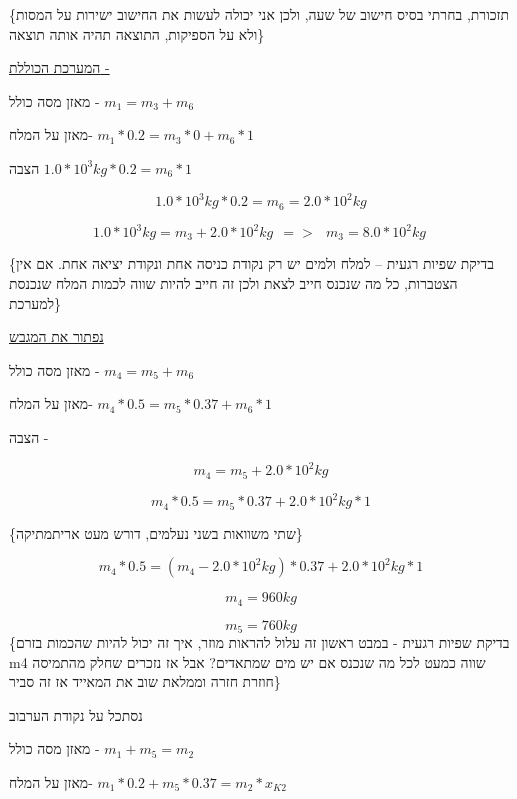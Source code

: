 \documentclass[
  hebrew,
  letterpaper,
  DIV=11,
  numbers=noendperiod]{scrreprt}
\begin{document}
\begin{tcolorbox}[enhanced jigsaw, colback=white, arc=.35mm, coltitle=black, breakable, toptitle=1mm, leftrule=.75mm, colbacktitle=quarto-callout-note-color!10!white, opacitybacktitle=0.6, bottomtitle=1mm, titlerule=0mm, opacityback=0, colframe=quarto-callout-note-color-frame, title=\textcolor{quarto-callout-note-color}{\faInfo}\hspace{0.5em}{דיאגרמת המערכת}, rightrule=.15mm, bottomrule=.15mm, toprule=.15mm, left=2mm]

\{תזכורת, בחרתי בסיס חישוב של שעה, ולכן אני יכולה לעשות את החישוב ישירות
על המסות ולא על הספיקות, התוצאה תהיה אותה תוצאה\}

\ul{המערכת הכוללת -}

מאזן מסה כולל - \(m_{1} = m_{3} + m_{6}\)

מאזן על המלח- \(m_{1}*0.2 = m_{3}*0 + m_{6}*1\)

הצבה \(1.0*10^{3}kg*0.2 = m_{6}*1\)

\[1.0*10^{3}kg*0.2 = \boxed{m_{6} = 2.0*10^{2}kg}\]

\[1.0*10^{3}kg = m_{3} + 2.0*10^{2}kg\ \  = > \ \ \ \boxed{m_{3} = 8.0*10^{2}kg}\ \]

\{בדיקת שפיות רגעית -- למלח ולמים יש רק נקודת כניסה אחת ונקודת יציאה
אחת. אם אין הצטברות, כל מה שנכנס חייב לצאת ולכן זה חייב להיות שווה לכמות
המלח שנכנסת למערכת\}

\ul{נפתור את המגבש}

מאזן מסה כולל - \(m_{4} = m_{5} + m_{6}\)

מאזן על המלח- \(m_{4}*0.5 = m_{5}*0.37 + m_{6}*1\)

הצבה -

\[m_{4} = m_{5} + 2.0*10^{2}kg\]

\[m_{4}*0.5 = m_{5}*0.37 + 2.0*10^{2}kg*1\]

\{שתי משוואות בשני נעלמים, דורש מעט אריתמתיקה\}

\[m_{4}*0.5 = (m_{4} - 2.0*10^{2}kg)*0.37 + 2.0*10^{2}kg*1\]

\[\boxed{m_{4} = 960kg}\]

\[\boxed{m_{5} = 760kg}\] \{בדיקת שפיות רגעית - במבט ראשון זה עלול
להראות מוזר, איך זה יכול להיות שהכמות בזרם m4 שווה כמעט לכל מה שנכנס אם
יש מים שמתאדים? אבל אז נזכרים שחלק מהתמיסה חוזרת חזרה וממלאת שוב את
המאייד אז זה סביר\}

נסתכל על נקודת הערבוב

מאזן מסה כולל - \(m_{1} + m_{5} = m_{2}\)

מאזן על המלח- \(m_{1}*0.2 + m_{5}*0.37 = m_{2}*x_{K2}\)


\end{tcolorbox}
\end{document}
